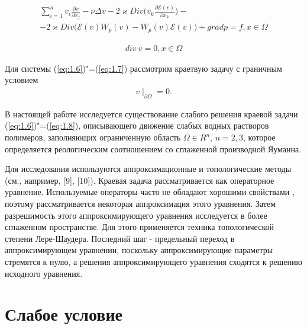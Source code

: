 \begin{equation}\label{eq:1.6}
    \begin{gathered}
        \sum_{i=1}^n v_i\frac{\partial v}{\partial x_j}-\nu\Delta v- 2\varkappa Div\bigg(v_k\frac{\partial\mathcal{E}(v)}
        {\partial x_k}\bigg)-\\-2\varkappa Div\bigg(\mathcal{E}(v)W_p(v)-W_p(v)\mathcal{E}(v)\bigg)+grad p=f, x\in\Omega
    \end{gathered}
\end{equation}

\begin{equation}\label{eq:1.7}
    \begin{gathered}
        div \ v=0, x\in\Omega
    \end{gathered}
\end{equation}

Для системы (\ref{eq:1.6})"=(\ref{eq:1.7}) рассмотрим краетвую задачу с граничным условием
\begin{equation}\label{eq:1.8}
     \begin{gathered}
         v\mid_{\partial\Omega}=0.
     \end{gathered}
\end{equation}

В настоящей работе исследуется существование слабого решения краевой задачи (\ref{eq:1.6})"=(\ref{eq:1.8}), описывающего движение слабых
водных растворов полимеров, заполняющих ограниченную область $\Omega \in R^n$, $n = 2,3$, которое определяется реологическим
соотношением  со сглаженной производной Яуманна.

Для исследования используются аппроксимационные и топологические методы
(см., например, [9], [10]). Краевая задача рассматривается как операторное уравнение. Используемые операторы часто не
обладают хорошими свойствами  , поэтому рассматривается некоторая аппроксимация этого уравнения. Затем разрешимость
этого аппроксимирующего уравнения исследуется в более сглаженном пространстве. Для этого применяется техника
топологической степени Лере-Шаудера. Последний шаг - предельный переход  в аппроксимирующем уравнении, поскольку
аппроксимирующие параметры стремятся к нулю, а решения аппроксимирующего уравнения сходятся к решению исходного
уравнения.


\section{Слабое условие}

